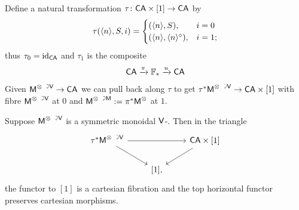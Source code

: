 \documentclass[a4paper,11pt]{article}
\begin{document}
\begin{construction}
  Define a natural transformation $\tau \colon \CA \times [1] \to \CA$ by
  \[ \tau(\langle n \rangle, S, i) =
    \begin{cases}
      (\langle n \rangle, S), & i = 0 \\
      (\langle n \rangle, \langle n \rangle^{\circ}), & i = 1;
    \end{cases}
  \]
  thus $\tau_{0} = \text{\textup{id}}_{\textup{\textsf{CA}}}$ and $\tau_{1}$ is the composite
  \[ \CA \xto{\pi} \xF_{*} \xto{u} \CA \] Given
  $\utract{M}{V} \to \CA$ we can pull back along $\tau$ to get
  $\tau^{*}\utract{M}{V} \to \CA \times [1]$ with fibre
  $\utract{M}{V}$ at $0$ and $\utract{M}{M} := \pi^{*}\uM^{\otimes}$
  at $1$.
\end{construction}

\begin{propn}\label{extract}
  Suppose $\utract{M}{V}$ is a symmetric monoidal $\textup{\textsf{V}}$-\icat{}. Then in the triangle
  \[
    \begin{tikzcd}
      \tau^{*}\utract{M}{V} \ar[rr] \ar[dr] & & \CA \times [1] \ar[dl] \\
      & {[1]},
    \end{tikzcd}
  \]
  the functor to $[1]$ is a cartesian fibration and the top horizontal
  functor preserves cartesian morphisms. 
\end{propn}
\end{document}
